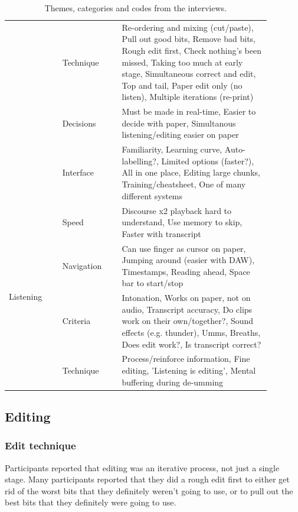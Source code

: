 \begin{table}[h]
{\begin{tabular}{|p{0.18\linewidth}|p{0.2\linewidth}|p{0.5\linewidth}|}
 & Technique & Re-ordering and mixing (cut/paste), Pull out good bits, Remove bad bits, Rough edit first, Check nothing's been missed, Taking too much at early stage, Simultaneous correct and edit, Top and tail, Paper edit only (no listen), Multiple iterations (re-print) \\ \cline{2-3}
 & Decisions & Must be made in real-time, Easier to decide with paper, Simultanous listening/editing easier on paper \\ \cline{2-3}
 & Interface & Familiarity, Learning curve, Auto-labelling?, Limited options (faster?), All in one place, Editing large chunks, Training/cheatsheet, One of many different systems \\ \hline
\multirow{4}{*}{Listening}
 & Speed & Discourse x2 playback hard to understand, Use memory to skip, Faster with transcript \\ \cline{2-3}
 & Navigation & Can use finger as cursor on paper, Jumping around (easier with DAW), Timestamps, Reading ahead, Space bar to start/stop \\ \cline{2-3}
 & Criteria & Intonation, Works on paper, not on audio, Transcript accuracy, Do clips work on their own/together?, Sound effects (e.g. thunder), Umms, Breaths, Does edit work?, Is transcript correct? \\ \cline{2-3}
 & Technique & Process/reinforce information, Fine editing, 'Listening is editing', Mental buffering during de-umming \\ \hline

\end{tabular}
}
\caption{Themes, categories and codes from the interviews.}
\label{tab:paper-codes}
\end{table}

\subsection{Editing}

\subsubsection{Edit technique}


Participants reported that editing was an iterative process, not just a single stage. Many participants reported that
they did a rough edit first to either get rid of the worst bits that they definitely weren't going to use, or to pull
out the best bits that they definitely were going to use.


